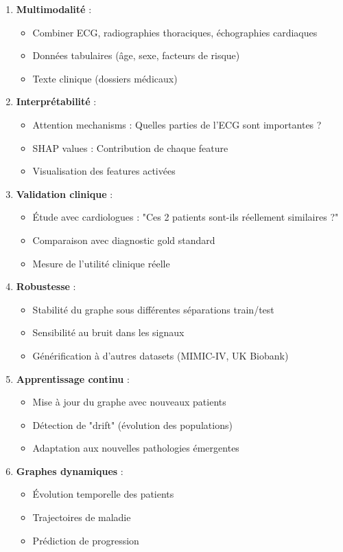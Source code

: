 \documentclass[12pt,a4paper]{article}
\begin{document}
\begin{enumerate}
    \item \textbf{Multimodalité} :
    \begin{itemize}
        \item Combiner ECG, radiographies thoraciques, échographies cardiaques
        \item Données tabulaires (âge, sexe, facteurs de risque)
        \item Texte clinique (dossiers médicaux)
    \end{itemize}

    \item \textbf{Interprétabilité} :
    \begin{itemize}
        \item Attention mechanisms : Quelles parties de l'ECG sont importantes ?
        \item SHAP values : Contribution de chaque feature
        \item Visualisation des features activées
    \end{itemize}

    \item \textbf{Validation clinique} :
    \begin{itemize}
        \item Étude avec cardiologues : "Ces 2 patients sont-ils réellement similaires ?"
        \item Comparaison avec diagnostic gold standard
        \item Mesure de l'utilité clinique réelle
    \end{itemize}

    \item \textbf{Robustesse} :
    \begin{itemize}
        \item Stabilité du graphe sous différentes séparations train/test
        \item Sensibilité au bruit dans les signaux
        \item Générification à d'autres datasets (MIMIC-IV, UK Biobank)
    \end{itemize}

    \item \textbf{Apprentissage continu} :
    \begin{itemize}
        \item Mise à jour du graphe avec nouveaux patients
        \item Détection de "drift" (évolution des populations)
        \item Adaptation aux nouvelles pathologies émergentes
    \end{itemize}

    \item \textbf{Graphes dynamiques} :
    \begin{itemize}
        \item Évolution temporelle des patients
        \item Trajectoires de maladie
        \item Prédiction de progression
    \end{itemize}
\end{enumerate}
\end{document}
